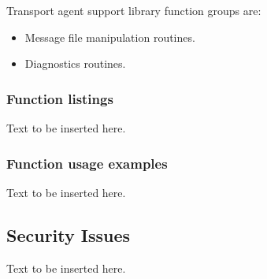 Transport agent support library function groups are:

\begin{itemize}
\item Message file manipulation routines.
\item Diagnostics routines.
\end{itemize}


\subsubsection{Function listings }

Text to be inserted here.

\subsubsection{Function usage examples}

Text to be inserted here.


\subsection{Security Issues}

Text to be inserted here.

